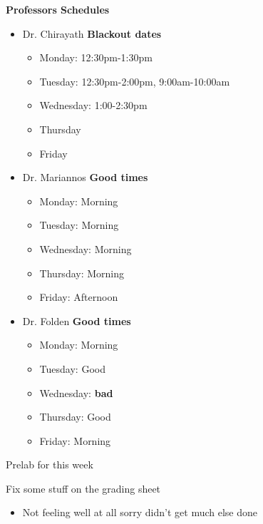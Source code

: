 \documentclass[idxtotoc,hyperref,openany,oneside]{labbook} %
\newcommand{\cmark}{\ding{51}}%
\newcommand{\done}{\rlap{$\square$}{\raisebox{2pt}{\large\hspace{1pt}\cmark}}%
  \hspace{-2.5pt}}
\begin{document}
\textbf{Professors Schedules}
\begin{itemize}
\item{Dr. Chirayath \textbf{Blackout dates}}
  \begin{itemize}
  \item{Monday: 12:30pm-1:30pm}
  \item{Tuesday: 12:30pm-2:00pm, 9:00am-10:00am}
  \item{Wednesday: 1:00-2:30pm}
  \item{Thursday}
  \item{Friday}
  \end{itemize}
\item{Dr. Mariannos \textbf{Good times}}
  \begin{itemize}
  \item{Monday: Morning}
  \item{Tuesday: Morning}
  \item{Wednesday: Morning}
  \item{Thursday: Morning}
  \item{Friday: Afternoon}
  \end{itemize}
\item{Dr. Folden \textbf{Good times}}
  \begin{itemize}
  \item{Monday: Morning}
  \item{Tuesday: Good}
  \item{Wednesday: \textbf{bad}}
  \item{Thursday: Good}
  \item{Friday: Morning}
  \end{itemize}
\end{itemize}







\begin{todolist}
\item[\done]{Prelab for this week}
\item[\done]{Fix some stuff on the grading sheet}
\end{todolist}

\begin{itemize}
\item{Not feeling well at all sorry didn't get much else done}
\end{itemize}
\end{document}
